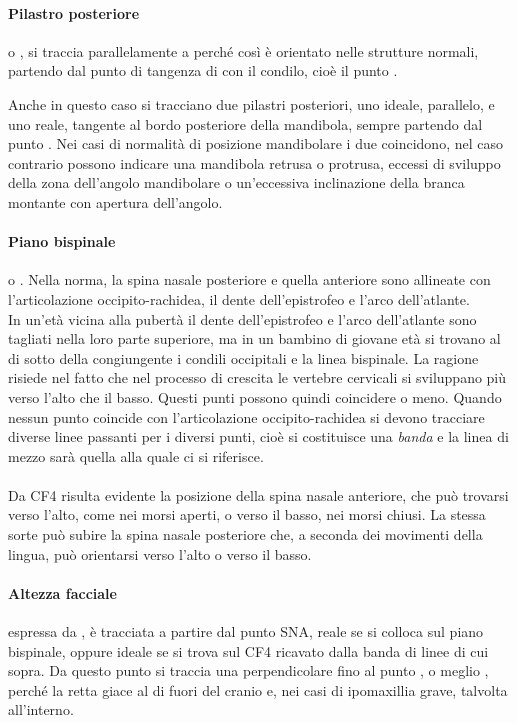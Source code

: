 \paragraph{Pilastro posteriore} o , si traccia parallelamente a  perché così è orientato nelle strutture normali, partendo dal punto di tangenza di  con il condilo, cioè il punto .

Anche in questo caso si tracciano due pilastri posteriori, uno ideale, parallelo, e uno reale, tangente al bordo posteriore della mandibola, sempre partendo dal punto . Nei casi di normalità di posizione mandibolare i due coincidono, nel caso contrario possono indicare una mandibola retrusa o protrusa, eccessi di sviluppo della zona dell'angolo mandibolare o un'eccessiva inclinazione della branca montante con apertura dell'angolo.

\paragraph{Piano bispinale} o . Nella norma, la spina nasale posteriore e quella anteriore sono allineate con l'articolazione occipito-rachidea, il dente dell'epistrofeo e l'arco dell'atlante.\\

In un'età vicina alla pubertà il dente dell'epistrofeo e l'arco dell'atlante sono tagliati nella loro parte superiore, ma in un bambino di giovane età si trovano al di sotto della congiungente i condili occipitali e la linea bispinale. La ragione risiede nel fatto che nel processo di crescita le vertebre cervicali si sviluppano più verso l'alto che il basso. Questi punti possono quindi coincidere o meno. Quando nessun punto coincide con l'articolazione occipito-rachidea si devono tracciare diverse linee passanti per i diversi punti, cioè si costituisce una \emph{banda} e la linea di mezzo sarà quella alla quale ci si riferisce.\\
\\
Da CF4 risulta evidente la posizione della spina nasale anteriore, che può trovarsi verso l'alto, come nei morsi aperti, o verso il basso, nei morsi chiusi. La stessa sorte può subire la spina nasale posteriore che, a seconda dei movimenti della lingua, può orientarsi verso l'alto o verso il basso.

\paragraph{Altezza facciale} espressa da , è tracciata a partire dal punto SNA, reale se si colloca sul piano bispinale, oppure ideale se si trova sul CF4 ricavato dalla banda di linee di cui sopra. Da questo punto si traccia una perpendicolare fino al punto , o meglio , perché la retta giace al di fuori del cranio e, nei casi di ipomaxillia grave, talvolta all'interno.\\

